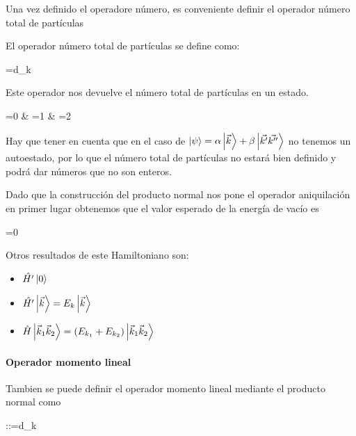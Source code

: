 Una vez definido el operadore número, es conveniente definir el operador número total de partículas 

\begin{definition}
  El operador número total de partículas se define como: 

  \begin{DispWithArrows}[format=c, displaystyle]
  =\int d_{k}
  \end{DispWithArrows}

  Este operador nos devuelve el número total de partículas en un estado. 
  \begin{DispWithArrows}[format=ccc, displaystyle]
  =0 & =1 &  =2
  \end{DispWithArrows}

  Hay que tener en cuenta que en el caso de $\ket{\psi}=\alpha \ket{\vec{k}}+\beta \ket{\vec{k'}\vec{k''}}$ no tenemos un autoestado, por lo que el número total de partículas no estará bien definido y podrá dar números que no son enteros.
\end{definition}

Dado que la construcción del producto normal nos pone el operador aniquilación en primer lugar obtenemos que el valor esperado de la energía de vacío es
\begin{DispWithArrows}[format=c, displaystyle]
=0
\end{DispWithArrows}

Otros resultados de este Hamiltoniano son:
\begin{itemize}
  \item $\hat{H'}\ket{0}$
  \item $\hat{H'}\ket{\vec{k}}=E_{k}\ket{\vec{k}}$
  \item $\hat{H}\ket{\vec{k}_{1}\vec{k}_{2}}=(E_{k_{1}}+E_{k_{2}})\ket{\vec{k}_{1}\vec{k}_{2}}$
\end{itemize}
\paragraph{Operador momento lineal }
Tambien se puede definir el operador momento lineal mediante el producto normal como 

\begin{DispWithArrows}[format=c, displaystyle]
::=\int d_{k}
\end{DispWithArrows}
